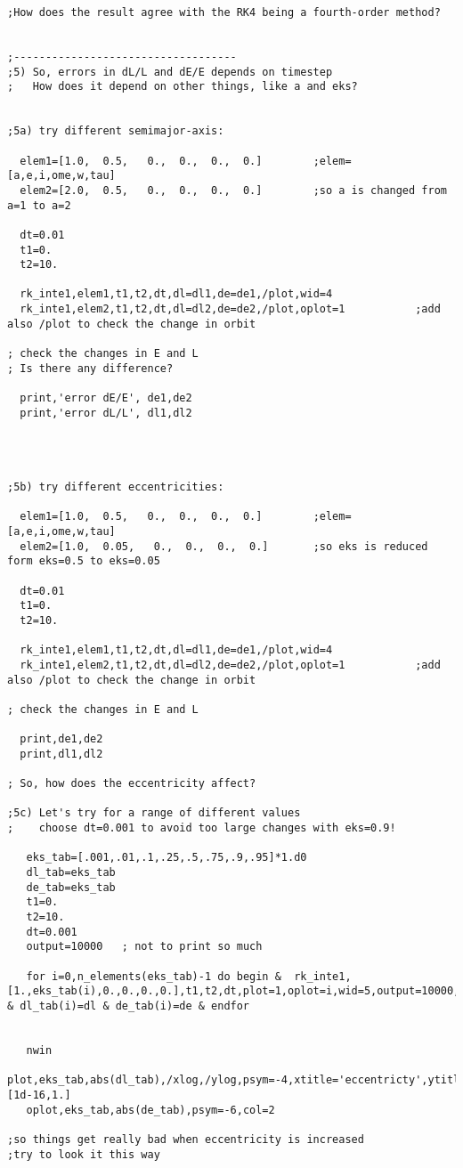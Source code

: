 \documentclass[12pt,landscape]{article}
\begin{document}
\begin{verbatim}
;How does the result agree with the RK4 being a fourth-order method?


;-----------------------------------
;5) So, errors in dL/L and dE/E depends on timestep
;   How does it depend on other things, like a and eks?


;5a) try different semimajor-axis:

  elem1=[1.0,  0.5,   0.,  0.,  0.,  0.]		;elem=[a,e,i,ome,w,tau]
  elem2=[2.0,  0.5,   0.,  0.,  0.,  0.]		;so a is changed from a=1 to a=2

  dt=0.01
  t1=0.
  t2=10.

  rk_inte1,elem1,t1,t2,dt,dl=dl1,de=de1,/plot,wid=4
  rk_inte1,elem2,t1,t2,dt,dl=dl2,de=de2,/plot,oplot=1           ;add also /plot to check the change in orbit

; check the changes in E and L
; Is there any difference?
  
  print,'error dE/E', de1,de2 
  print,'error dL/L', dl1,dl2




;5b) try different eccentricities:

  elem1=[1.0,  0.5,   0.,  0.,  0.,  0.]		;elem=[a,e,i,ome,w,tau]
  elem2=[1.0,  0.05,   0.,  0.,  0.,  0.]		;so eks is reduced form eks=0.5 to eks=0.05

  dt=0.01
  t1=0.
  t2=10.

  rk_inte1,elem1,t1,t2,dt,dl=dl1,de=de1,/plot,wid=4
  rk_inte1,elem2,t1,t2,dt,dl=dl2,de=de2,/plot,oplot=1           ;add also /plot to check the change in orbit

; check the changes in E and L

  print,de1,de2
  print,dl1,dl2

; So, how does the eccentricity affect?

;5c) Let's try for a range of different values
;    choose dt=0.001 to avoid too large changes with eks=0.9! 

   eks_tab=[.001,.01,.1,.25,.5,.75,.9,.95]*1.d0
   dl_tab=eks_tab
   de_tab=eks_tab
   t1=0.
   t2=10.
   dt=0.001
   output=10000   ; not to print so much
  
   for i=0,n_elements(eks_tab)-1 do begin &  rk_inte1,[1.,eks_tab(i),0.,0.,0.,0.],t1,t2,dt,plot=1,oplot=i,wid=5,output=10000,dl=dl,de=de & dl_tab(i)=dl & de_tab(i)=de & endfor


   nwin
   plot,eks_tab,abs(dl_tab),/xlog,/ylog,psym=-4,xtitle='eccentricty',ytitle='error',yr=[1d-16,1.]
   oplot,eks_tab,abs(de_tab),psym=-6,col=2

;so things get really bad when eccentricity is increased
;try to look it this way


\end{verbatim}
\end{document}
